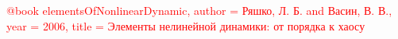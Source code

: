 \documentclass[12pt, a4paper]{article}
\newcommand{\comment}[1]{\textcolor{red}{#1}}
\begin{document}
    \tableofcontents

    

    \newpage

    

    \newpage

    

    \newpage

    

    \comment{@book{
  elementsOfNonlinearDynamic,
  author = {Ряшко, Л. Б. and Васин, В. В.},
  year = {2006},
  title = {Элементы нелинейной динамики: от порядка к хаосу}
}}

    
    
\end{document}
